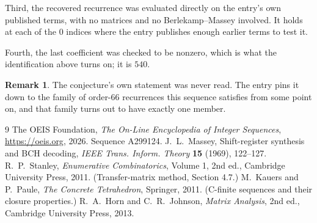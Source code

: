 \documentclass[11pt,a4paper]{article}
\theoremstyle{plain}
\theoremstyle{definition}
\newtheorem{remark}[theorem]{Remark}
\begin{document}
Third, the recovered recurrence was evaluated directly on the entry's own published terms, with
no matrices and no Berlekamp--Massey involved. It holds at each of the $0$ indices where
the entry publishes enough earlier terms to test it.

Fourth, the last coefficient was checked to be nonzero, which is what the identification above
turns on; it is $540$.

\begin{remark}
The conjecture's own statement was never read. The entry pins it down to the family of
order-$66$ recurrences this sequence satisfies from some point on, and that family turns
out to have exactly one member.
\end{remark}

\begin{thebibliography}{9}
 The OEIS Foundation, \emph{The On-Line Encyclopedia of Integer
Sequences}, \url{https://oeis.org}, 2026. Sequence A299124.
 J.~L.~Massey, Shift-register synthesis and BCH decoding, \emph{IEEE
Trans. Inform. Theory} \textbf{15} (1969), 122--127.
 R.~P.~Stanley, \emph{Enumerative Combinatorics}, Volume 1, 2nd ed.,
Cambridge University Press, 2011. (Transfer-matrix method, Section 4.7.)
 M.~Kauers and P.~Paule, \emph{The Concrete Tetrahedron}, Springer, 2011.
(C-finite sequences and their closure properties.)
 R.~A.~Horn and C.~R.~Johnson, \emph{Matrix Analysis}, 2nd ed., Cambridge
University Press, 2013.
\end{thebibliography}
\end{document}
